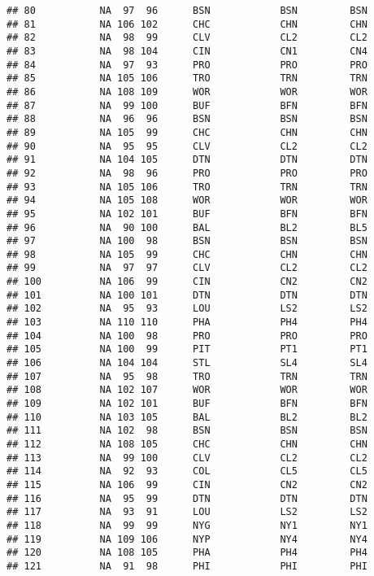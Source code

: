 \documentclass[]{article}
\begin{document}
\begin{verbatim}
## 80           NA  97  96      BSN            BSN         BSN
## 81           NA 106 102      CHC            CHN         CHN
## 82           NA  98  99      CLV            CL2         CL2
## 83           NA  98 104      CIN            CN1         CN4
## 84           NA  97  93      PRO            PRO         PRO
## 85           NA 105 106      TRO            TRN         TRN
## 86           NA 108 109      WOR            WOR         WOR
## 87           NA  99 100      BUF            BFN         BFN
## 88           NA  96  96      BSN            BSN         BSN
## 89           NA 105  99      CHC            CHN         CHN
## 90           NA  95  95      CLV            CL2         CL2
## 91           NA 104 105      DTN            DTN         DTN
## 92           NA  98  96      PRO            PRO         PRO
## 93           NA 105 106      TRO            TRN         TRN
## 94           NA 105 108      WOR            WOR         WOR
## 95           NA 102 101      BUF            BFN         BFN
## 96           NA  90 100      BAL            BL2         BL5
## 97           NA 100  98      BSN            BSN         BSN
## 98           NA 105  99      CHC            CHN         CHN
## 99           NA  97  97      CLV            CL2         CL2
## 100          NA 106  99      CIN            CN2         CN2
## 101          NA 100 101      DTN            DTN         DTN
## 102          NA  95  93      LOU            LS2         LS2
## 103          NA 110 110      PHA            PH4         PH4
## 104          NA 100  98      PRO            PRO         PRO
## 105          NA 100  99      PIT            PT1         PT1
## 106          NA 104 104      STL            SL4         SL4
## 107          NA  95  98      TRO            TRN         TRN
## 108          NA 102 107      WOR            WOR         WOR
## 109          NA 102 101      BUF            BFN         BFN
## 110          NA 103 105      BAL            BL2         BL2
## 111          NA 102  98      BSN            BSN         BSN
## 112          NA 108 105      CHC            CHN         CHN
## 113          NA  99 100      CLV            CL2         CL2
## 114          NA  92  93      COL            CL5         CL5
## 115          NA 106  99      CIN            CN2         CN2
## 116          NA  95  99      DTN            DTN         DTN
## 117          NA  93  91      LOU            LS2         LS2
## 118          NA  99  99      NYG            NY1         NY1
## 119          NA 109 106      NYP            NY4         NY4
## 120          NA 108 105      PHA            PH4         PH4
## 121          NA  91  98      PHI            PHI         PHI

\end{verbatim}
\end{document}

